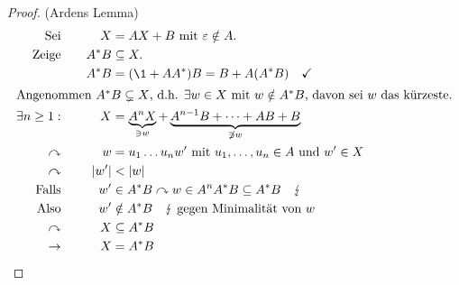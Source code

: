 \begin{proof}(Ardens Lemma)
	\begin{alignat*}{3}
		\text{Sei}&\quad& X&= AX+B\text{ mit }\Eps\notin A.\\
		\text{Zeige}&& A^*B&\subseteq X.\\
		&& A^*B &= (\1+AA^*)B = B+A(A^*B) \quad\checkmark\\
		\shortintertext{Angenommen $A^*B \subsetneq X$, d.h. $\exists w\in X$ mit $w\notin A^*B$, davon sei $w$ das kürzeste.}
		\exists n\geq 1: && X &= \underbrace{A^nX}_{\ni w} + \underbrace{A^{n-1}B+\dots +AB+B}_{\not\ni w}\\
		\curvearrowright && w &= u_1\dots u_n w'\text{ mit } u_1,\dots,u_n\in A\text{ und } w'\in X\\
		\curvearrowright && |w'| &< |w|\\
		\text{Falls}&& w'&\in A^*B \curvearrowright w\in A^nA^*B\subseteq A^*B \quad \lightning\\
		\text{Also} && w'&\notin A^*B \quad\lightning\text{ gegen Minimalität von }w\\
		\curvearrowright && X&\subseteq A^*B\\
		\-> && X &= A^*B \tag*{\qedhere}
	\end{alignat*}
\end{proof}


